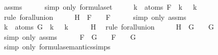 \begin{isabellebody}
\ assms{\isacharparenleft}{}{\isacharparenright}\isanewline
\ \ \ \ \isamarkupfalse%
\ {\isacharparenleft}simp\ only{\isacharcolon}\ formula{\isachardot}set{\isacharparenleft}{}{\isacharparenright}{\isacharparenright}\isanewline
\ \ \isamarkupfalse%
\ \isamarkupfalse%
\ {\isachardoublequoteopen}{\isasymforall}k\ {\isasymin}\ atoms\ F{\isachardot}\ {\isasymA}\ k\ {\isacharequal}\ {\isasymA}\ k{\isachardoublequoteclose}\isanewline
\ \ \ \ \isamarkupfalse%
\ {\isacharparenleft}rule\ forall{\isacharunderscore}union{}{\isacharparenright}\isanewline
\ \ \isamarkupfalse%
\ \isamarkupfalse%
\ H{}{\isacharcolon}{\isachardoublequoteopen}{\isasymA}\ {\isasymTurnstile}\ F\ {\isasymlongleftrightarrow}\ {\isasymA}\ {\isasymTurnstile}\ F{\isachardoublequoteclose}\isanewline
\ \ \ \ \isamarkupfalse%
\ {\isacharparenleft}simp\ only{\isacharcolon}\ assms{\isacharparenleft}{}{\isacharparenright}{\isacharparenright}\isanewline
\ \ \isamarkupfalse%
\ {\isachardoublequoteopen}{\isasymforall}k\ {\isasymin}\ atoms\ G{\isachardot}\ {\isasymA}\ k\ {\isacharequal}\ {\isasymA}\ k{\isachardoublequoteclose}\isanewline
\ \ \ \ \isamarkupfalse%
\ H\ \isamarkupfalse%
\ {\isacharparenleft}rule\ forall{\isacharunderscore}union{}{\isacharparenright}\isanewline
\ \ \isamarkupfalse%
\ \isamarkupfalse%
\ H{}{\isacharcolon}{\isachardoublequoteopen}{\isasymA}\ {\isasymTurnstile}\ G\ {\isasymlongleftrightarrow}\ {\isasymA}\ {\isasymTurnstile}\ G{\isachardoublequoteclose}\isanewline
\ \ \ \ \isamarkupfalse%
\ {\isacharparenleft}simp\ only{\isacharcolon}\ assms{\isacharparenleft}{}{\isacharparenright}{\isacharparenright}\isanewline
\ \ \isamarkupfalse%
\ {\isachardoublequoteopen}{\isasymA}\ {\isasymTurnstile}\ F\ \isactrlbold {\isasymand}\ G\ {\isacharequal}\ {\isacharparenleft}{\isasymA}\ {\isasymTurnstile}\ F\ {\isasymand}\ {\isasymA}\ {\isasymTurnstile}\ G{\isacharparenright}{\isachardoublequoteclose}\isanewline
\ \ \ \ \isamarkupfalse%
\ {\isacharparenleft}simp\ only{\isacharcolon}\ formula{\isacharunderscore}semantics{\isachardot}simps{\isacharparenleft}{}{\isacharparenright}{\isacharparenright}\isanewline

\end{isabellebody}
